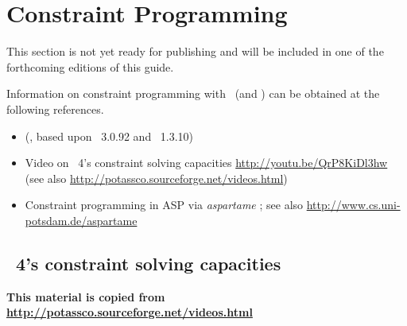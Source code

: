 \section{Constraint Programming}\label{sec:constraint}

This section is not yet ready for publishing
and will be included in one of the forthcoming editions of this guide.

Information on constraint programming with \gringo\ (and \clingcon) can be obtained at the following references.

\begin{itemize}
\item \cite{geossc09a,ostsch12a} (\clingcon, based upon \gringo~3.0.92 and \clasp~1.3.10)
\item Video on \gringo~4's constraint solving capacities \url{http://youtu.be/QrP8KiDl3hw} (see also \url{http://potassco.sourceforge.net/videos.html})
\item Constraint programming in ASP via \textit{aspartame} \cite{bageinscsotawe13a}; see also \url{http://www.cs.uni-potsdam.de/aspartame}
\end{itemize}


\subsection*{\gringo~4's constraint solving capacities}

\textbf{This material is copied from \url{http://potassco.sourceforge.net/videos.html}}

